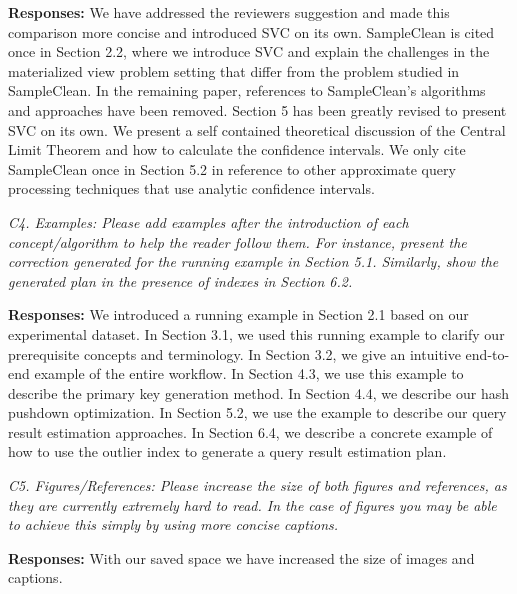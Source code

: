 \vspace{.25em}

{\bf Responses:} We have addressed the reviewers suggestion and made this comparison more concise and introduced SVC on its own. SampleClean is cited once in Section 2.2, where we introduce SVC and explain the challenges in the materialized view problem setting that differ from the problem studied in SampleClean. In the remaining paper, references to SampleClean’s algorithms and approaches have been removed. Section 5 has been greatly revised to present SVC on its own. We present a self contained theoretical discussion of the Central Limit Theorem and how to calculate the confidence intervals. We only cite SampleClean once in Section 5.2 in reference to other approximate query processing techniques that use analytic confidence intervals.

\vspace{1em}
\emph{C4. Examples: Please add examples after the introduction of each concept/algorithm to help the reader follow them. For instance, present the correction generated for the running example in Section 5.1. Similarly, show the generated plan in the presence of indexes in Section 6.2.}

\vspace{.25em}

{\bf Responses:} We introduced a running example in Section 2.1 based on our experimental dataset. In Section 3.1, we used this running example to clarify our prerequisite concepts and terminology. In Section 3.2, we give an intuitive end-to-end example of the entire workflow. In Section 4.3, we use this example to describe the primary key generation method. In Section 4.4, we describe our hash pushdown optimization. In Section 5.2, we use the example to describe our query result estimation approaches.  In Section 6.4, we describe a concrete example of how to use the outlier index to generate a query result estimation plan. 

\vspace{1em}
\emph{C5. Figures/References: Please increase the size of both figures and references, as they are currently extremely hard to read. In the case of figures you may be able to achieve this simply by using more concise captions.}

\vspace{.25em}

{\bf Responses:} With our saved space we have increased the size of images and captions.

